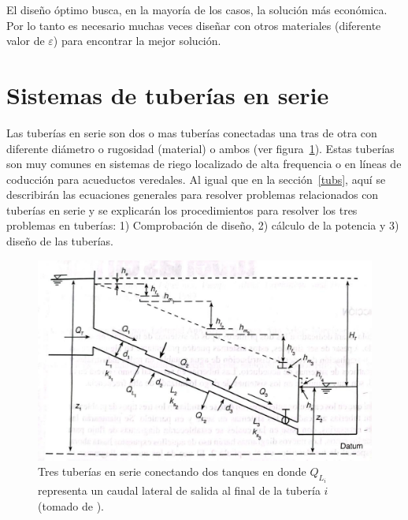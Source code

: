 \documentclass[11pt, oneside]{article}
\begin{document}
El dise\~no \'optimo busca, en la mayor\'ia de los casos, la soluci\'on m\'as econ\'omica. Por lo tanto es necesario muchas veces dise\~nar con otros materiales (diferente valor de $\varepsilon$) para encontrar  la mejor soluci\'on.
 

\section{Sistemas de tuber\'ias en serie} 
Las tuber\'ias en serie son dos o mas tuber\'ias conectadas una tras de otra con diferente di\'ametro o rugosidad (material) o ambos (ver figura~\ref{ttuse}). Estas tuber\'ias son muy comunes en sistemas de riego localizado de alta frequencia o en l\'ineas de coducci\'on para acueductos veredales. Al igual que en la secci\'on~\ref{tubs}, aqu\'i se describir\'an las ecuaciones generales para resolver problemas relacionados con tuber\'ias en serie y se explicar\'an los procedimientos para resolver los tres problemas en tuber\'ias: 1) Comprobaci\'on de dise\~no, 2) c\'alculo de la potencia y 3) dise\~no de las tuber\'ias.

\begin{figure}[h]
\centering
\includegraphics[width=12cm]{./figs/comp2.jpeg}
\caption{Tres tuber\'ias en serie conectando dos tanques en donde $Q_{L_i}$ representa un caudal lateral de salida al final de la tuber\'ia $i$ (tomado de \cite{saldarriaga}).} 
\label{ttuse}
\end{figure}
\end{document}
